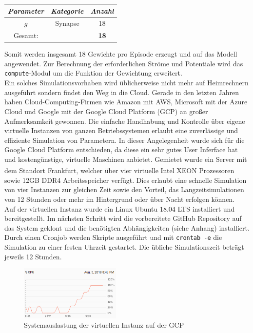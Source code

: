 		\begin{center}
			\begin{tabular}{c@{\hskip 0.5cm}c@{\hskip 0.5cm}c@{\hskip 0.5cm}}    \toprule
				\setlength{\tabcolsep}{50pt}
				\renewcommand{\arraystretch}{1.5}
				\emph{Parameter}	& \emph{Kategorie}  & \emph{Anzahl} \\\midrule
				$g$					& Synapse			& 18			\\\bottomrule
				Gesamt:				&					& \textbf{18}	\\
				\hline
			\end{tabular}
		\end{center}
		Somit werden insgesamt 18 Gewichte pro Episode erzeugt und auf das Modell angewendet. Zur Berechnung der erforderlichen Ströme und Potentiale wird das \texttt{compute}-Modul um die Funktion der Gewichtung erweitert.\\
		Ein solches Simulationsvorhaben wird üblicherweise nicht mehr auf Heimrechnern ausgeführt sondern findet den Weg in die Cloud. Gerade in den letzten Jahren haben Cloud-Computing-Firmen wie Amazon mit AWS, Microsoft mit der Azure Cloud und Google mit der Google Cloud Platform (GCP) an großer Aufmerksamkeit gewonnen. Die einfache Handhabung und Kontrolle über eigene virtuelle Instanzen von ganzen Betriebssystemen erlaubt eine zuverlässige und effiziente Simulation von Parametern. In dieser Angelegenheit wurde sich für die Google Cloud Platform entschieden, da diese ein sehr gutes User Inferface hat und kostengünstige, virtuelle Maschinen anbietet. Gemietet wurde ein Server mit dem Standort Frankfurt, welcher über vier virtuelle Intel XEON\textsuperscript{\textregistered} Prozessoren sowie 12GB DDR4 Arbeitsspeicher verfügt. Dies erlaubt eine schnelle Simulation von vier Instanzen zur gleichen Zeit sowie den Vorteil, das Langzeitsimulationen von 12 Stunden oder mehr im Hintergrund oder über Nacht erfolgen können.\\
		Auf der virtuellen Instanz wurde ein Linux Ubuntu 18.04 LTS installiert und bereitgestellt. Im nächsten Schritt wird die vorbereitete GitHub Repository \cite{BA} auf das System geklont und die benötigten Abhängigkeiten (siehe Anhang) installiert. Durch einen Cronjob werden Skripte ausgeführt und mit \texttt{crontab -e} die Simulation zu einer festen Uhrzeit gestartet. Die übliche Simulationszeit beträgt jeweils 12 Stunden.
		\begin{figure}[!h] %
			\centering
			\includegraphics[width=5cm]{figures/chap_implement/GCP.png}
			\caption{Systemauslastung der virtuellen Instanz auf der GCP}
			\label{fig:gcp_1}
		\end{figure}\\
